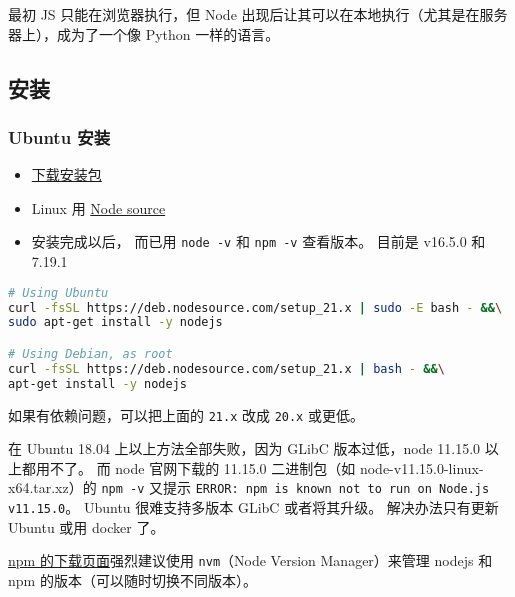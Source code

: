 

最初 JS 只能在浏览器执行，但 Node 出现后让其可以在本地执行（尤其是在服务器上），成为了一个像 Python 一样的语言。

\subsection{安装}
\subsubsection{Ubuntu 安装}
\begin{itemize}
\item \href{https://nodejs.org/en/download/package-manager/}{下载安装包}
\item Linux 用 \href{https://github.com/nodesource/distributions/blob/master/README.md#installation-instructions}{Node source}
\item 安装完成以后， 而已用 \verb`node -v` 和 \verb`npm -v` 查看版本。 目前是 v16.5.0 和 7.19.1
\end{itemize}
\begin{lstlisting}[language=bash]
# Using Ubuntu
curl -fsSL https://deb.nodesource.com/setup_21.x | sudo -E bash - &&\
sudo apt-get install -y nodejs

# Using Debian, as root
curl -fsSL https://deb.nodesource.com/setup_21.x | bash - &&\
apt-get install -y nodejs
\end{lstlisting}
如果有依赖问题，可以把上面的 \verb`21.x` 改成 \verb`20.x` 或更低。

在 Ubuntu 18.04 上以上方法全部失败，因为 GLibC 版本过低，node 11.15.0 以上都用不了。 而 node 官网下载的 11.15.0 二进制包（如 node-v11.15.0-linux-x64.tar.xz）的 \verb`npm -v` 又提示 \verb`ERROR: npm is known not to run on Node.js v11.15.0`。 Ubuntu 很难支持多版本 GLibC 或者将其升级。 解决办法只有更新 Ubuntu 或用 docker 了。

\href{https://docs.npmjs.com/downloading-and-installing-node-js-and-npm}{npm 的下载页面}强烈建议使用 \verb`nvm`（Node Version Manager）来管理 nodejs 和 npm 的版本（可以随时切换不同版本）。

